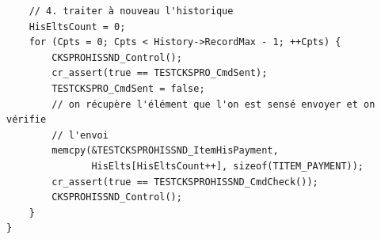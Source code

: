 \documentclass[a4paper]{article}
\begin{document}
\begin{verbatim}
    // 4. traiter à nouveau l'historique
    HisEltsCount = 0;
    for (Cpts = 0; Cpts < History->RecordMax - 1; ++Cpts) {
        CKSPROHISSND_Control();
        cr_assert(true == TESTCKSPRO_CmdSent);
        TESTCKSPRO_CmdSent = false;
        // on récupère l'élément que l'on est sensé envoyer et on vérifie
        // l'envoi
        memcpy(&TESTCKSPROHISSND_ItemHisPayment,
               HisElts[HisEltsCount++], sizeof(TITEM_PAYMENT));
        cr_assert(true == TESTCKSPROHISSND_CmdCheck());
        CKSPROHISSND_Control();
    }
}
\end{verbatim}
\label{testsaveckwash}
\end{document}
